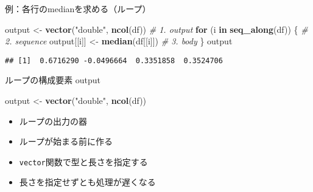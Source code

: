 \documentclass[ignorenonframetext,]{beamer}
\newenvironment{Shaded}{\begin{snugshade}}{\end{snugshade}}
\newcommand{\KeywordTok}[1]{\textcolor[rgb]{0.13,0.29,0.53}{\textbf{#1}}}
\newcommand{\StringTok}[1]{\textcolor[rgb]{0.31,0.60,0.02}{#1}}
\newcommand{\CommentTok}[1]{\textcolor[rgb]{0.56,0.35,0.01}{\textit{#1}}}
\newcommand{\ControlFlowTok}[1]{\textcolor[rgb]{0.13,0.29,0.53}{\textbf{#1}}}
\newcommand{\NormalTok}[1]{#1}
\providecommand{\tightlist}{%
  \setlength{\itemsep}{0pt}\setlength{\parskip}{0pt}}
\begin{document}
\begin{frame}[fragile]{例：各行のmedianを求める（ループ）}

\begin{Shaded}
\begin{Highlighting}[]
\NormalTok{output <-}\StringTok{ }\KeywordTok{vector}\NormalTok{(}\StringTok{"double"}\NormalTok{, }\KeywordTok{ncol}\NormalTok{(df))  }\CommentTok{# 1. output}
\ControlFlowTok{for}\NormalTok{ (i }\ControlFlowTok{in} \KeywordTok{seq_along}\NormalTok{(df)) \{            }\CommentTok{# 2. sequence}
\NormalTok{  output[[i]] <-}\StringTok{ }\KeywordTok{median}\NormalTok{(df[[i]])      }\CommentTok{# 3. body}
\NormalTok{\}}
\NormalTok{output}
\end{Highlighting}
\end{Shaded}

\begin{verbatim}
## [1]  0.6716290 -0.0496664  0.3351858  0.3524706
\end{verbatim}

\end{frame}

\begin{frame}[fragile]{ループの構成要素 output}

\begin{Shaded}
\begin{Highlighting}[]
\NormalTok{output <-}\StringTok{ }\KeywordTok{vector}\NormalTok{(}\StringTok{"double"}\NormalTok{, }\KeywordTok{ncol}\NormalTok{(df))}
\end{Highlighting}
\end{Shaded}

\begin{itemize}
\tightlist
\item
  ループの出力の器
\item
  ループが始まる前に作る
\item
  \texttt{vector}関数で型と長さを指定する
\item
  長さを指定せずとも処理が遅くなる
\end{itemize}

\end{frame}
\end{document}
